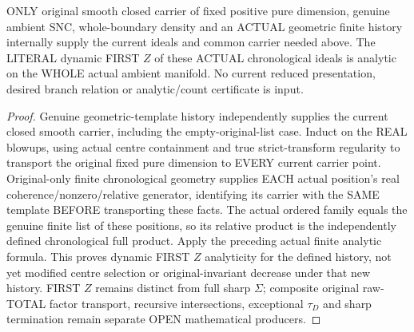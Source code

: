 \begin{theorem}
\label{hir:sharp-original-actual-chronological-distinct-defect-analytic}
\leanok
ONLY original smooth closed carrier of fixed positive pure dimension,
genuine ambient SNC, whole-boundary density and an ACTUAL geometric finite
history internally supply the current ideals and common carrier needed
above. The LITERAL dynamic FIRST $Z$ of these ACTUAL chronological ideals
is analytic on the WHOLE actual ambient manifold. No current reduced
presentation, desired branch relation or analytic/count certificate is input.
\end{theorem}
\begin{proof}
Genuine geometric-template history independently supplies the current closed
smooth carrier, including the empty-original-list case. Induct on the REAL
blowups, using actual centre containment and true strict-transform regularity
to transport the original fixed pure dimension to EVERY current carrier
point. Original-only finite chronological geometry supplies EACH actual
position's real coherence/nonzero/relative generator, identifying its carrier
with the SAME template BEFORE transporting these facts. The actual ordered
family equals the genuine finite list of these positions, so its relative
product is the independently defined chronological full product. Apply the
preceding actual finite analytic formula. This proves dynamic FIRST $Z$
analyticity for the defined history, not yet modified centre selection or
original-invariant decrease under that new history. FIRST $Z$ remains
distinct from full sharp $\Sigma$; composite original raw-TOTAL factor
transport, recursive intersections, exceptional $\tau_D$ and sharp
termination remain separate OPEN mathematical producers.
\end{proof}
